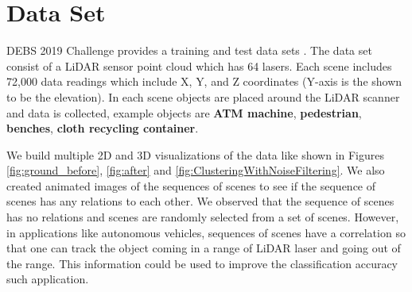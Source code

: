 \section{Data Set}
DEBS 2019  Challenge provides a training and test data sets \cite{DEBSGC2019}.
The data set consist of a LiDAR sensor point cloud which has 64 lasers. Each scene includes 72,000 data readings which include X, Y, and Z coordinates (Y-axis is the shown to be the elevation).
In each scene objects are placed around the LiDAR scanner and data is collected, example objects are \textbf{ATM machine}, \textbf{pedestrian}, \textbf{benches}, \textbf{cloth recycling container}.

We build multiple 2D and 3D visualizations of the data like shown in Figures \ref{fig:ground_before},  \ref{fig:after} and \ref{fig:ClusteringWithNoiseFiltering}.
We also created animated images of the sequences of scenes to see if the sequence of scenes has any relations to each other.
We observed that the sequence of scenes has no relations and scenes are randomly selected from a set of scenes.
However, in applications like autonomous vehicles, sequences of scenes have a correlation so that one can track the object coming in a range of LiDAR laser and going out of the range.
This information could be used to improve the classification accuracy such application.


%


%

